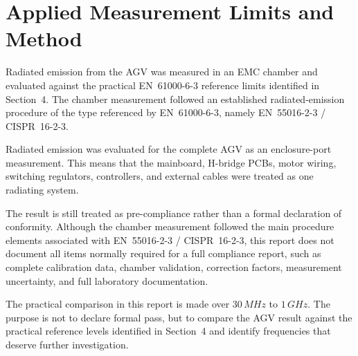 \section{Applied Measurement Limits and Method}

Radiated emission from the AGV was measured in an EMC chamber and evaluated against
the practical EN~61000-6-3 reference limits identified in Section~4. The chamber
measurement followed an established radiated-emission procedure of the type referenced
by EN~61000-6-3, namely EN~55016-2-3 / CISPR~16-2-3.

Radiated emission was evaluated for the complete AGV as an enclosure-port
measurement. This means that the mainboard, H-bridge PCBs, motor wiring, switching
regulators, controllers, and external cables were treated as one radiating system.

The result is still treated as pre-compliance rather than a formal declaration of
conformity. Although the chamber measurement followed the main procedure elements
associated with EN~55016-2-3 / CISPR~16-2-3, this report does not document all items
normally required for a full compliance report, such as complete calibration data,
chamber validation, correction factors, measurement uncertainty, and full laboratory
documentation.

The practical comparison in this report is made over \(30\,MHz\) to \(1\,GHz\). The
purpose is not to declare formal pass, but to compare the AGV result against the
practical reference levels identified in Section~4 and identify frequencies that deserve
further investigation.

